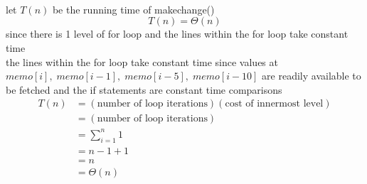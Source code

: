 \documentclass[12pt,border=4pt,multi]{article}%
\begin{document}
\leavevmode
\\
\\
\\
let $T(n)$ be the running time of makechange()
\[T(n) = \Theta(n)\]
since there is 1 level of for loop and the lines within the for loop take constant time\\
the lines within the for loop take constant time since values at $memo[i],\;memo[i - 1],\;memo[i - 5],\;memo[i - 10]$ are readily available to be fetched and the if statements are constant time comparisons\\
\begin{align*}
    T(n) &= (\text{number of loop iterations})(\text{cost of innermost level})\\
    &= (\text{number of loop iterations})\\
    &= \sum_{i = 1}^n 1\\
    &= n - 1 + 1\\
    &= n\\
    &= \Theta(n)\\
\end{align*}
\end{document}

